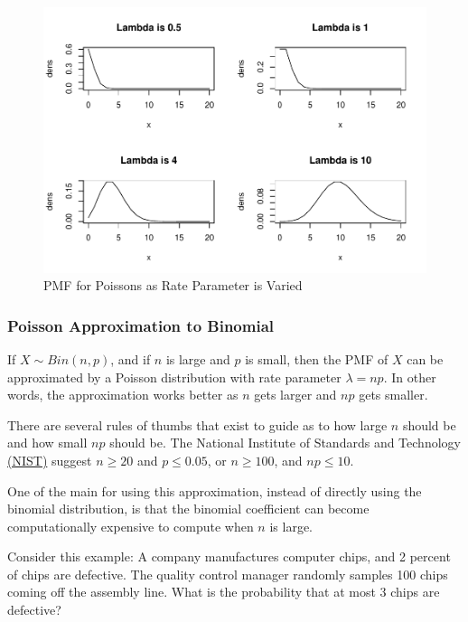 \documentclass[
]{book}
\begin{document}
\begin{figure}
\centering
\includegraphics{bookdown-demo_files/figure-latex/3-pmfs-lambda-1.pdf}
\caption{\label{fig:3-pmfs-lambda}PMF for Poissons as Rate Parameter is Varied}
\end{figure}

\subsubsection{Poisson Approximation to Binomial}\label{poisson-approximation-to-binomial}

If \(X \sim Bin(n,p)\), and if \(n\) is large and \(p\) is small, then the PMF of \(X\) can be approximated by a Poisson distribution with rate parameter \(\lambda = np\). In other words, the approximation works better as \(n\) gets larger and \(np\) gets smaller.

There are several rules of thumbs that exist to guide as to how large \(n\) should be and how small \(np\) should be. The National Institute of Standards and Technology \href{https://www.itl.nist.gov/div898/handbook/pmc/section3/pmc331.htm}{(NIST)} suggest \(n \geq 20\) and \(p \leq 0.05\), or \(n \geq 100\), and \(np \leq 10\).

One of the main for using this approximation, instead of directly using the binomial distribution, is that the binomial coefficient can become computationally expensive to compute when \(n\) is large.

Consider this example: A company manufactures computer chips, and 2 percent of chips are defective. The quality control manager randomly samples 100 chips coming off the assembly line. What is the probability that at most 3 chips are defective?
\end{document}

